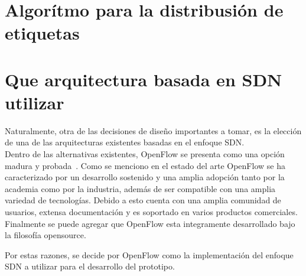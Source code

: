 \section[Algor\'itmo para la distribusi\'on de etiquetas]{Algor\'itmo para la distribusi\'on de etiquetas}

 
\section[Que arquitectura basada en SDN utilizar]{Que arquitectura basada en SDN utilizar}


 
Naturalmente, otra de las decisiones de dise\~no importantes a tomar, es la elecci\'on de una de las arquitecturas existentes basadas en el enfoque SDN.\\
  
Dentro de las alternativas existentes, OpenFlow se presenta como una opci\'on madura y probada~\citep{Ofelia}. Como se menciono en el estado del arte OpenFlow  se ha caracterizado por un desarrollo sostenido y una amplia adopci\'on tanto por la academia como por la industria, adem\'as de ser compatible con una amplia variedad de tecnolog\'ias. Debido a esto cuenta con una amplia comunidad de usuarios, extensa documentaci\'on y es soportado en varios productos comerciales\citep{Pica8}\citep{HP}\citep{Centec}\citep{SDNProductlist}. Finalmente se puede agregar que OpenFlow esta integramente desarrollado bajo la filosof\'ia opensource. 

Por estas razones, se decide por OpenFlow como la implementaci\'on del enfoque SDN a utilizar para el desarrollo del prototipo.\\





